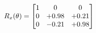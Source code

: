 \documentclass[preview]{standalone}
\begin{document}
\begin{align*}
\special{dvisvgm:raw <g id='unique000'>}R_{x}(\theta) = \begin{bmatrix}1 & 0 & 0 \\0 & +0.98 & +0.21 \\0 & -0.21 & +0.98\end{bmatrix}\special{dvisvgm:raw </g>}
\end{align*}
\end{document}
